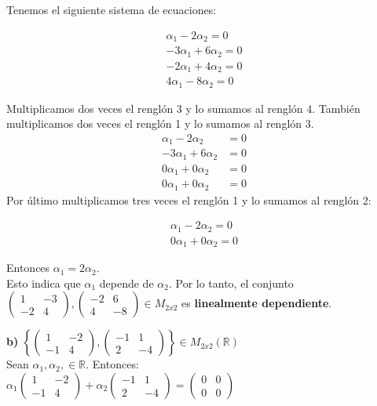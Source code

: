 \documentclass[letterpaper]{article}
\renewcommand{\*}{\cdot}
\theoremstyle{definition}
\begin{document}
Tenemos el siguiente sistema de ecuaciones:
\begin{center}
\begin{align*}
	\alpha_{1}-2\alpha_{2} = 0\\
	-3\alpha_{1} + 6\alpha_{2} = 0\\
	-2\alpha_{1}+4\alpha_{2}= 0\\
	4\alpha_{1}-8\alpha_{2}= 0
\end{align*}
\end{center}
Multiplicamos dos veces el renglón 3 y lo sumamos al renglón 4. También multiplicamos dos veces el renglón 1 y lo sumamos al renglón 3.
\begin{align*}	
	\alpha_{1}-2\alpha_{2} &= 0\\
	-3\alpha_{1}+6\alpha_{2}&= 0\\
	0\alpha_{1}+0\alpha_{2}&=0\\
	0\alpha_{1}+0\alpha_{2}&= 0
\end{align*}
Por último multiplicamos tres veces el renglón 1 y lo sumamos al renglón 2:
\begin{center}
\begin{align*}
	\alpha_{1}-2\alpha_{2}=0\\
	0\alpha_{1}+0\alpha_{2}=0
\end{align*}	
\end{center}
Entonces $\alpha_{1}=2\alpha_{2}$.\\ Esto indica que $\alpha_{1}$ depende de $\alpha_{2}$. Por lo tanto, el conjunto  $\begin{pmatrix} 1 & -3 \\ -2 & 4 \end{pmatrix} , \begin{pmatrix} -2 & 6 \\ 4 & -8 \end{pmatrix}\in M_{2x2}$  es \textbf{linealmente dependiente}.

\textbf{b)} $\left \lbrace \begin{pmatrix} 1 & -2 \\ -1 & 4 \end{pmatrix} ,\begin{pmatrix} -1 & 1 \\ 2 & -4 \end{pmatrix}  \right \rbrace \in M_{2x2}(\mathbb{R})$\\

Sean $\alpha _1, \alpha _2, \in \mathbb{R}$. Entonces:\\

$\alpha_1 \begin{pmatrix} 1 & -2 \\ -1 & 4 \end{pmatrix}  + \alpha_2 \begin{pmatrix} -1 & 1 \\ 2 & -4 \end{pmatrix} = \begin{pmatrix}
0 & 0 \\ 0 & 0 \end{pmatrix}$\\
\end{document}

